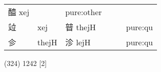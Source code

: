\documentclass[14pt,a4paper]{scrartcl}
\begin{document}
\begin{longtable}[c]{@{}llllll@{}}
\begin{minipage}[t]{0.14\columnwidth}
醯 xej
\strut\end{minipage} &
\begin{minipage}[t]{0.14\columnwidth}\raggedright\strut
\strut\end{minipage} &
\begin{minipage}[t]{0.14\columnwidth}\raggedright\strut
pure:other
\strut\end{minipage}\tabularnewline
\begin{minipage}[t]{0.14\columnwidth}\raggedright\strut
竝
\strut\end{minipage} &
\begin{minipage}[t]{0.14\columnwidth}\raggedright\strut
xej
\strut\end{minipage} &
\begin{minipage}[t]{0.14\columnwidth}\raggedright\strut
暜 thejH
\strut\end{minipage} &
\begin{minipage}[t]{0.14\columnwidth}\raggedright\strut
\strut\end{minipage} &
\begin{minipage}[t]{0.14\columnwidth}\raggedright\strut
\strut\end{minipage} &
\begin{minipage}[t]{0.14\columnwidth}\raggedright\strut
pure:qu
\strut\end{minipage}\tabularnewline
\begin{minipage}[t]{0.14\columnwidth}\raggedright\strut
㐱
\strut\end{minipage} &
\begin{minipage}[t]{0.14\columnwidth}\raggedright\strut
thejH
\strut\end{minipage} &
\begin{minipage}[t]{0.14\columnwidth}\raggedright\strut
沴 lejH
\strut\end{minipage} &
\begin{minipage}[t]{0.14\columnwidth}\raggedright\strut
\strut\end{minipage} &
\begin{minipage}[t]{0.14\columnwidth}\raggedright\strut
\strut\end{minipage} &
\begin{minipage}[t]{0.14\columnwidth}\raggedright\strut
pure:qu
\strut\end{minipage}\tabularnewline
\bottomrule
\end{longtable}

(324) 1242 {[}2{]}
\end{document}

